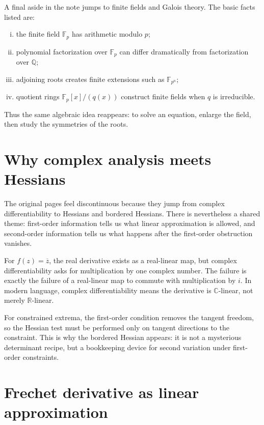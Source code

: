 A final aside in the note jumps to finite fields and Galois theory.  The basic facts listed are:
\begin{enumerate}[(i)]
  \item the finite field \(\mathbb F_p\) has arithmetic modulo \(p\);
  \item polynomial factorization over \(\mathbb F_p\) can differ dramatically from factorization over \(\mathbb Q\);
  \item adjoining roots creates finite extensions such as \(\mathbb F_{p^n}\);
  \item quotient rings \(\mathbb F_p[x]/(q(x))\) construct finite fields when \(q\) is irreducible.

\end{enumerate}
Thus the same algebraic idea reappears: to solve an equation, enlarge the field, then study the symmetries of the roots.

\section{Why complex analysis meets Hessians}

The original pages feel discontinuous because they jump from complex differentiability to Hessians and bordered Hessians.  There is nevertheless a shared theme: first-order information tells us what linear approximation is allowed, and second-order information tells us what happens after the first-order obstruction vanishes.

For \(f(z)=\overline z\), the real derivative exists as a real-linear map, but complex differentiability asks for multiplication by one complex number.  The failure is exactly the failure of a real-linear map to commute with multiplication by \(i\).  In modern language, complex differentiability means the derivative is \(\mathbb C\)-linear, not merely \(\mathbb R\)-linear.

For constrained extrema, the first-order condition removes the tangent freedom, so the Hessian test must be performed only on tangent directions to the constraint.  This is why the bordered Hessian appears: it is not a mysterious determinant recipe, but a bookkeeping device for second variation under first-order constraints.


\section{Frechet derivative as linear approximation}

